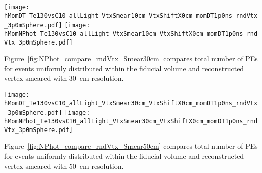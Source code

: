 \begin{figure*}[ht]
  \centering
  \texttt{[image: hMomDT\_Te130vsC10\_allLight\_VtxSmear10cm\_VtxShiftX0cm\_momDT1p0ns\_rndVtx\_3p0mSphere.pdf]}
  \texttt{[image: hMomNPhot\_Te130vsC10\_allLight\_VtxSmear10cm\_VtxShiftX0cm\_momDT1p0ns\_rndVtx\_3p0mSphere.pdf]}
  \caption{(Left) Difference between measured PE arrival time and arrival time prediction based on
        vertex location (T$^{predicted} = |r_{hit} - r_{vtx}|/v_{phot}$, where $v_phot = c/1.53$).
        $\vbb$-decay (black solid line) and $\Cten$ events (magenta dashed line) are compared.
        Vertical line at 1~ns indicates cut for early light selection.
        (Right) Total number of PEs in the early light sample.
        $^{10}$C events with energy deposition in the range between 2.1 and 2.9~MeV are
        selected. Verticies are uniformly distributed within the fiducial volume, $R<3$~m.
        {\bf Vetrex is smeared with 10~cm resolution.}}
\label{fig:NPhot_compare_rndVtx_Smear10cm}
\end{figure*}



Figure~\ref{fig:NPhot_compare_rndVtx_Smear30cm} compares total number of PEs for events uniformly
distributed within the fiducial volume and reconstructed vertex smeared with 30~cm resolution.

\begin{figure*}[ht]
  \centering
  \texttt{[image: hMomDT\_Te130vsC10\_allLight\_VtxSmear30cm\_VtxShiftX0cm\_momDT1p0ns\_rndVtx\_3p0mSphere.pdf]}
  \texttt{[image: hMomNPhot\_Te130vsC10\_allLight\_VtxSmear30cm\_VtxShiftX0cm\_momDT1p0ns\_rndVtx\_3p0mSphere.pdf]}
  \caption{(Left) Difference between measured PE arrival time and arrival time prediction based on
        vertex location (T$^{predicted} = |r_{hit} - r_{vtx}|/v_{phot}$, where $v_phot = c/1.53$).
        $\vbb$-decay (black solid line) and $\Cten$ events (magenta dashed line) are compared.
        Vertical line at 1~ns indicates cut for early light selection.
        (Right) Total number of PEs in the early light sample.
        $^{10}$C events with energy deposition in the range between 2.1 and 2.9~MeV are
        selected. Verticies are uniformly distributed within the fiducial volume, $R<3$~m.
        {\bf Vetrex is smeared with 30~cm resolution.}}
\label{fig:NPhot_compare_rndVtx_Smear30cm}
\end{figure*}


Figure~\ref{fig:NPhot_compare_rndVtx_Smear50cm} compares total number of PEs for events uniformly
distributed within the fiducial volume and reconstructed vertex smeared with 50~cm resolution.

